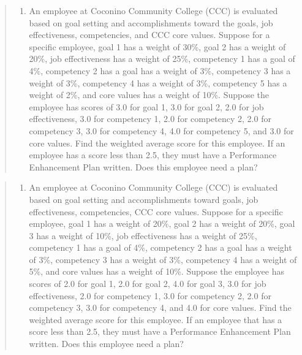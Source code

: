 \documentclass[]{book}
\providecommand{\tightlist}{%
  \setlength{\itemsep}{0pt}\setlength{\parskip}{0pt}}
\begin{document}
\begin{quote}
\begin{enumerate}
\def\labelenumi{\arabic{enumi}.}
\setcounter{enumi}{6}
\tightlist
\item
  An employee at Coconino Community College (CCC) is evaluated based on goal setting and accomplishments toward the goals, job effectiveness, competencies, and CCC core values. Suppose for a specific employee, goal 1 has a weight of 30\%, goal 2 has a weight of 20\%, job effectiveness has a weight of 25\%, competency 1 has a goal of 4\%, competency 2 has a goal has a weight of 3\%, competency 3 has a weight of 3\%, competency 4 has a weight of 3\%, competency 5 has a weight of 2\%, and core values has a weight of 10\%. Suppose the employee has scores of 3.0 for goal 1, 3.0 for goal 2, 2.0 for job effectiveness, 3.0 for competency 1, 2.0 for competency 2, 2.0 for competency 3, 3.0 for competency 4, 4.0 for competency 5, and 3.0 for core values. Find the weighted average score for this employee. If an employee has a score less than 2.5, they must have a Performance Enhancement Plan written. Does this employee need a plan?
\end{enumerate}
\end{quote}

\begin{quote}
\begin{enumerate}
\def\labelenumi{\arabic{enumi}.}
\setcounter{enumi}{7}
\tightlist
\item
  An employee at Coconino Community College (CCC) is evaluated based on goal setting and accomplishments toward goals, job effectiveness, competencies, CCC core values. Suppose for a specific employee, goal 1 has a weight of 20\%, goal 2 has a weight of 20\%, goal 3 has a weight of 10\%, job effectiveness has a weight of 25\%, competency 1 has a goal of 4\%, competency 2 has a goal has a weight of 3\%, competency 3 has a weight of 3\%, competency 4 has a weight of 5\%, and core values has a weight of 10\%. Suppose the employee has scores of 2.0 for goal 1, 2.0 for goal 2, 4.0 for goal 3, 3.0 for job effectiveness, 2.0 for competency 1, 3.0 for competency 2, 2.0 for competency 3, 3.0 for competency 4, and 4.0 for core values. Find the weighted average score for this employee. If an employee that has a score less than 2.5, they must have a Performance Enhancement Plan written. Does this employee need a plan?
\end{enumerate}
\end{quote}
\end{document}
